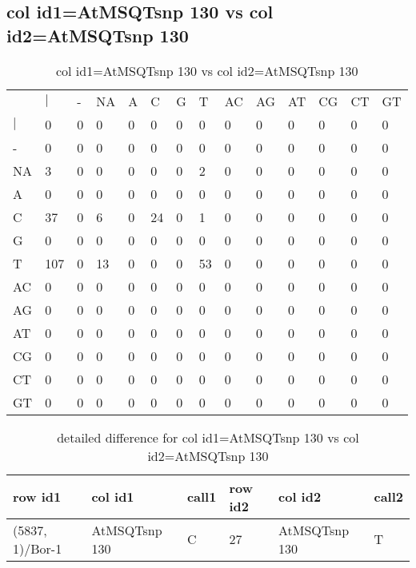 \subsection{col id1=AtMSQTsnp 130 vs col id2=AtMSQTsnp 130}
\begin{center}
\begin{longtable}{|l|l|l|l|l|l|l|l|l|l|l|l|l|l|}
\caption{col id1=AtMSQTsnp 130 vs col id2=AtMSQTsnp 130} \label{table_dm520}\\
\hline
\\
\hline
&$|$&-&NA&A&C&G&T&AC&AG&AT&CG&CT&GT\\
$|$&0&0&0&0&0&0&0&0&0&0&0&0&0\\
-&0&0&0&0&0&0&0&0&0&0&0&0&0\\
NA&3&0&0&0&0&0&2&0&0&0&0&0&0\\
A&0&0&0&0&0&0&0&0&0&0&0&0&0\\
C&37&0&6&0&24&0&1&0&0&0&0&0&0\\
G&0&0&0&0&0&0&0&0&0&0&0&0&0\\
T&107&0&13&0&0&0&53&0&0&0&0&0&0\\
AC&0&0&0&0&0&0&0&0&0&0&0&0&0\\
AG&0&0&0&0&0&0&0&0&0&0&0&0&0\\
AT&0&0&0&0&0&0&0&0&0&0&0&0&0\\
CG&0&0&0&0&0&0&0&0&0&0&0&0&0\\
CT&0&0&0&0&0&0&0&0&0&0&0&0&0\\
GT&0&0&0&0&0&0&0&0&0&0&0&0&0\\
\hline
\end{longtable}
\end{center}

\begin{center}
\begin{longtable}{|l|l|l|l|l|l|}
\caption{detailed difference for col id1=AtMSQTsnp 130 vs col id2=AtMSQTsnp 130} \label{table_dm521}\\
\hline
row id1&col id1&call1&row id2&col id2&call2\\
\hline
(5837, 1)/Bor-1&AtMSQTsnp 130&C&27&AtMSQTsnp 130&T\\
\hline
\end{longtable}
\end{center}

